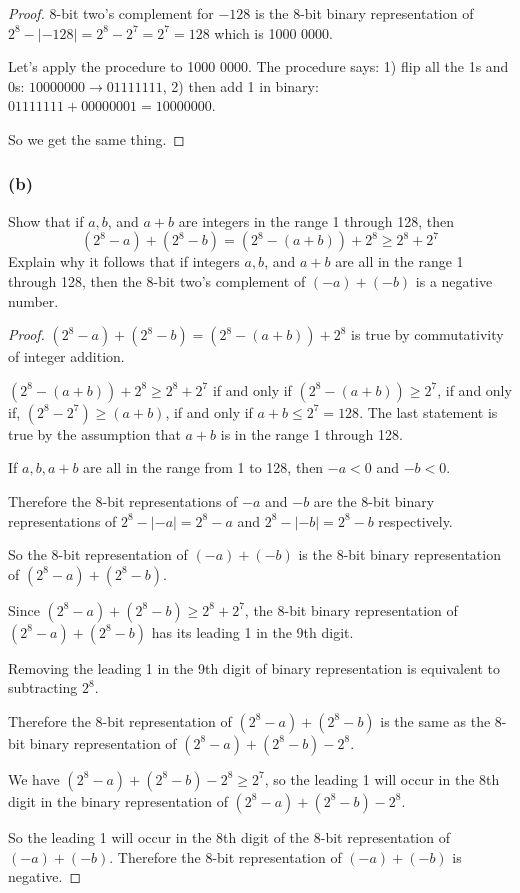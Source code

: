 \documentclass[14pt]{extarticle}
\begin{document}
\begin{proof} 
8-bit two's complement for $-128$ is the 8-bit binary representation of $2^8 - |-128| = 2^8 - 2^7 = 2^7 = 128$ which is 1000 0000.

Let's apply the procedure to 1000 0000. The procedure says: 1) flip all the 1s and 0s: $1000 0000 \to 0111 1111$, 2) then add 1 in binary: $0111 1111 + 0000 0001 = 1000 0000$.

So we get the same thing. 
\end{proof}

\subsubsection{(b)} 
Show that if $a, b$, and $a + b$ are integers in the range 1 through 128, then $$ (2^8 - a) + (2^8 - b) = (2^8 - (a + b)) + 2^8 \geq 2^8 + 2^7 $$ Explain why it follows that if integers $a, b$, and $a + b$ are all in the range 1 through 128, then the 8-bit two’s complement of $(-a) + (-b)$ is a negative number.

\begin{proof} 
$(2^8 - a) + (2^8 - b) = (2^8 - (a + b)) + 2^8$ is true by commutativity of integer addition.

$(2^8 - (a + b)) + 2^8 \geq 2^8 + 2^7$ if and only if $(2^8 - (a + b)) \geq 2^7$, if and only if, $(2^8 - 2^7) \geq (a + b)$, if and only if $a + b \leq 2^7 = 128$. The last statement is true by the assumption that $a+b$ is in the range 1 through 128.

If $a, b, a+b$ are all in the range from 1 to 128, then $-a < 0$ and $-b < 0$. 

Therefore the 8-bit representations of $-a$ and $-b$ are the 8-bit binary representations of $2^8 - |-a| = 2^8 - a$ and $2^8 - |-b| = 2^8 - b$ respectively.

So the 8-bit representation of $(-a) + (-b)$ is the 8-bit binary representation of $(2^8 - a) + (2^8 - b)$.

Since $(2^8 - a) + (2^8 - b) \geq 2^8 + 2^7$, the 8-bit binary representation of $(2^8 - a) + (2^8 - b)$ has its leading 1 in the 9th digit.

Removing the leading 1 in the 9th digit of binary representation is equivalent to subtracting $2^8$.

Therefore the 8-bit representation of $(2^8 - a) + (2^8 - b)$ is the same as the 8-bit binary representation of $(2^8 - a) + (2^8 - b) - 2^8$.

We have $(2^8 - a) + (2^8 - b) - 2^8 \geq 2^7$, so the leading 1 will occur in the 8th digit in the binary representation of $(2^8 - a) + (2^8 - b) - 2^8$.

So the leading 1 will occur in the 8th digit of the 8-bit representation of $(-a) + (-b)$. Therefore the 8-bit representation of $(-a) + (-b)$ is negative. 
\end{proof}
\end{document}
